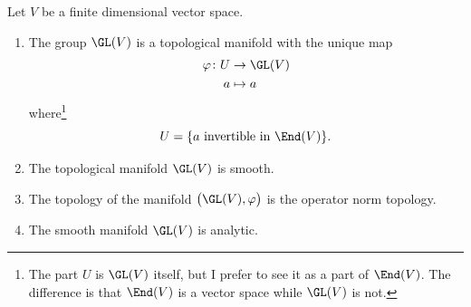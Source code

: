 \begin{proposition}	\label{PROPooQJANooMaqLvV}
	Let \( V\) be a finite dimensional vector space.

	\begin{enumerate}
		\item

		      The group \( \GL(V)\) is a topological manifold with the unique map
		      \begin{equation}
			      \begin{aligned}
				      \varphi\colon U & \to \GL(V) \\
				      a               & \mapsto a
			      \end{aligned}
		      \end{equation}
		      where\footnote{The part \( U\) is \( \GL(V) \) itself, but I prefer to see it as a part of \( \End(V)\). The difference is that \( \End(V) \) is a vector space while \( \GL(V)\) is not.}
		      \begin{equation}
			      U=\{ \text{\( a\) invertible in \( \End(V)\)} \}.
		      \end{equation}
		\item
		      The topological manifold \( \GL(V)\) is smooth.
		\item		\label{ITEMooZWFDooWPiScd}
		      The topology of the manifold \( \big( \GL(V),\varphi \big) \) is the operator norm topology.
		\item		\label{ITEMooBSXTooIrGFco}
		      The smooth manifold \( \GL(V)\) is analytic.
	\end{enumerate}
\end{proposition}

